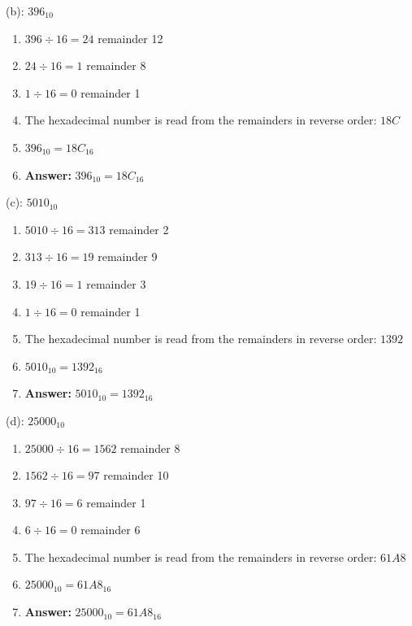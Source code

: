 \documentclass{article}
\begin{document}
\vspace*{0.5cm}

\noindent (b): $396_{10}$

\begin{enumerate}
    \item $396 \div 16 = 24$ remainder 12
    \item $24 \div 16 = 1$ remainder 8
    \item $1 \div 16 = 0$ remainder 1
    \item The hexadecimal number is read from the remainders in reverse order: $18C$
    \item $396_{10} = 18C_{16}$
    \item \textbf{Answer:} $396_{10} = 18C_{16}$
\end{enumerate}

\vspace*{0.5cm}

\noindent (c): $5010_{10}$

\begin{enumerate}
    \item $5010 \div 16 = 313$ remainder 2
    \item $313 \div 16 = 19$ remainder 9
    \item $19 \div 16 = 1$ remainder 3
    \item $1 \div 16 = 0$ remainder 1
    \item The hexadecimal number is read from the remainders in reverse order: $1392$
    \item $5010_{10} = 1392_{16}$
    \item \textbf{Answer:} $5010_{10} = 1392_{16}$
\end{enumerate}

\newpage

\noindent (d): $25000_{10}$

\begin{enumerate}
    \item $25000 \div 16 = 1562$ remainder 8
    \item $1562 \div 16 = 97$ remainder 10
    \item $97 \div 16 = 6$ remainder 1
    \item $6 \div 16 = 0$ remainder 6
    \item The hexadecimal number is read from the remainders in reverse order: $61A8$
    \item $25000_{10} = 61A8_{16}$
    \item \textbf{Answer:} $25000_{10} = 61A8_{16}$
\end{enumerate}
\end{document}
